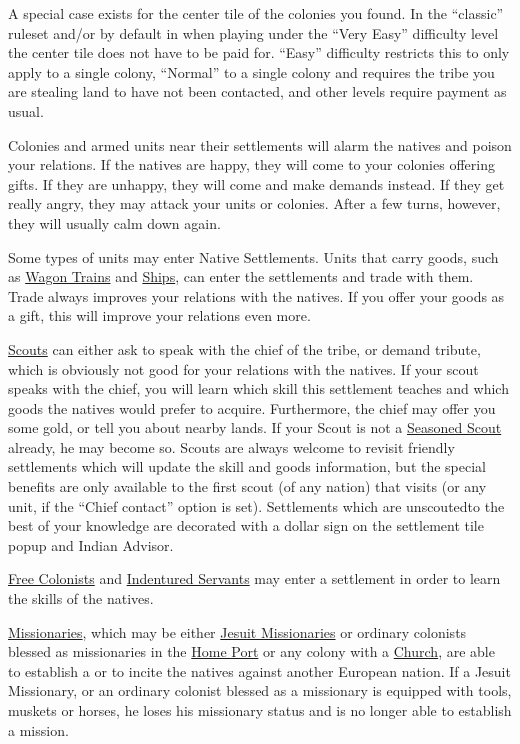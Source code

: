 \documentclass[12pt]{book}
\begin{document}
A special case exists for the center tile of the colonies you found.
In the ``classic'' ruleset and/or by default in when playing under the
``Very Easy'' difficulty level the center tile does not have to be
paid for.  ``Easy'' difficulty restricts this to only apply to a
single colony, ``Normal'' to a single colony and requires the tribe
you are stealing land to have not been contacted, and other levels
require payment as usual.

Colonies and armed units near their settlements will alarm the natives
and poison your relations. If the natives are happy, they will come to
your colonies offering gifts. If they are unhappy, they will come and
make demands instead. If they get really angry, they may attack your
units or colonies. After a few turns, however, they will usually calm
down again.

Some types of units may enter Native Settlements. Units that carry
goods, such as \hyperlink{Wagon Train}{Wagon Trains} and
\hyperlink{Naval Units}{Ships}, can enter the settlements and trade
with them. Trade always improves your relations with the natives. If
you offer your goods as a gift, this will improve your relations even
more.

\hyperlink{Scout}{Scouts} can either ask to speak with the chief of
the tribe, or demand tribute, which is obviously not good for your
relations with the natives. If your scout speaks with the chief, you
will learn which skill this settlement teaches and which goods the
natives would prefer to acquire. Furthermore, the chief may offer you
some gold, or tell you about nearby lands. If your Scout is not a
\hyperlink{Seasoned Scout}{Seasoned Scout} already, he may become so.
Scouts are always welcome to revisit friendly settlements which will
update the skill and goods information, but the special benefits are
only available to the first scout (of any nation) that visits (or any
unit, if the ``Chief contact'' option is set).  Settlements which are
unscoutedto the best of your knowledge are decorated with a dollar
sign on the settlement tile popup and Indian Advisor.

\hyperlink{Free Colonist}{Free Colonists} and \hyperlink{Indentured
Servant}{Indentured Servants} may enter a settlement in order to learn
the skills of the natives.

\hyperlink{Missionary}{Missionaries}, which may be either
\hyperlink{Jesuit Missionary}{Jesuit Missionaries} or ordinary
colonists blessed as missionaries in the \hyperlink{Home Port}{Home
  Port} or any colony with a \hyperlink{Church}{Church}, are able to
establish a  or to incite the natives against another
European nation. If a Jesuit Missionary, or an ordinary colonist
blessed as a missionary is equipped with tools, muskets or horses, he
loses his missionary status and is no longer able to establish a
mission.
\end{document}
